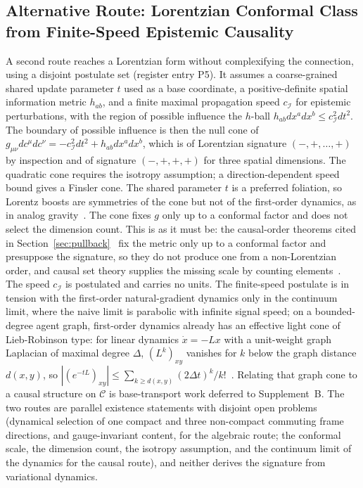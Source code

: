 \subsection{Alternative Route: Lorentzian Conformal Class from Finite-Speed Epistemic Causality}
\label{sec:causal_cone_route}

A second route reaches a Lorentzian form without complexifying the connection, using a disjoint postulate set (register entry P5). It assumes a coarse-grained shared update parameter $t$ used as a base coordinate, a positive-definite spatial information metric $h_{ab}$, and a finite maximal propagation speed $c_\mathcal{I}$ for epistemic perturbations, with the region of possible influence the $h$-ball $h_{ab}dx^a dx^b \le c_\mathcal{I}^2 dt^2$. The boundary of possible influence is then the null cone of $g_{\mu\nu} dc^\mu dc^\nu = -c_\mathcal{I}^2 dt^2 + h_{ab} dx^a dx^b$, which is of Lorentzian signature $(-,+,\ldots,+)$ by inspection and of signature $(-,+,+,+)$ for three spatial dimensions. The quadratic cone requires the isotropy assumption; a direction-dependent speed bound gives a Finsler cone. The shared parameter $t$ is a preferred foliation, so Lorentz boosts are symmetries of the cone but not of the first-order dynamics, as in analog gravity~\cite{BarceloLiberatiVisser2011}. The cone fixes $g$ only up to a conformal factor and does not select the dimension count. This is as it must be: the causal-order theorems cited in Section~\ref{sec:pullback}~\cite{HawkingKingMcCarthy1976, Malament1977} fix the metric only up to a conformal factor and presuppose the signature, so they do not produce one from a non-Lorentzian order, and causal set theory supplies the missing scale by counting elements~\cite{BombelliLeeMeyerSorkin1987}. The speed $c_\mathcal{I}$ is postulated and carries no units. The finite-speed postulate is in tension with the first-order natural-gradient dynamics only in the continuum limit, where the naive limit is parabolic with infinite signal speed; on a bounded-degree agent graph, first-order dynamics already has an effective light cone of Lieb-Robinson type: for linear dynamics $\dot{x} = -Lx$ with a unit-weight graph Laplacian of maximal degree $\Delta$, $(L^k)_{xy}$ vanishes for $k$ below the graph distance $d(x,y)$, so $|(e^{-tL})_{xy}| \le \sum_{k \ge d(x,y)}(2\Delta t)^k/k!$~\cite{LiebRobinson1972, Marchioro1978}. Relating that graph cone to a causal structure on $\mathcal{C}$ is base-transport work deferred to Supplement~B. The two routes are parallel existence statements with disjoint open problems (dynamical selection of one compact and three non-compact commuting frame directions, and gauge-invariant content, for the algebraic route; the conformal scale, the dimension count, the isotropy assumption, and the continuum limit of the dynamics for the causal route), and neither derives the signature from variational dynamics.

